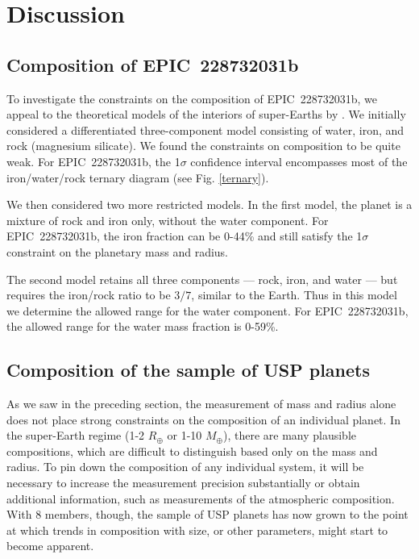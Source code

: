 \documentclass[twocolumn]{aastex61}
\begin{document}
\section{Discussion}

\subsection{Composition of EPIC~228732031b}

To investigate the constraints on the composition of  EPIC~228732031b,
we appeal to the theoretical models of the interiors of super-Earths by \citet{Zeng2016}.
We initially considered a differentiated three-component model
consisting of water, iron, and rock (magnesium silicate). We found the constraints on composition
to be quite weak. For EPIC~228732031b, the 1$\sigma$ confidence interval encompasses most of the iron/water/rock ternary diagram (see Fig. \ref{ternary}).

We then considered two more restricted models. In the first model, the planet is a mixture of rock and iron only, without the water component. For EPIC~228732031b, the iron fraction can be 0-44\% and still satisfy the 1$\sigma$ constraint on the planetary mass and radius.


The second model retains all three components --- rock, iron, and water --- but requires the iron/rock ratio to be $3/7$, similar
to the Earth. Thus in this model we determine the allowed range for the water component.
For EPIC~228732031b, the allowed range for the water mass fraction is 0-59\%.%


\subsection{Composition of the sample of USP planets}

As we saw in the preceding section, the measurement of mass and radius alone does not place
strong constraints on the composition of an individual planet. In the super-Earth regime (1-2 $R_{\oplus}$ or 1-10 $M_{\oplus}$),
there are many plausible compositions, which are difficult to distinguish based only on the mass and radius. To pin down the composition of any individual system, it will be necessary
to increase the measurement precision substantially or obtain additional information, such as
measurements of the atmospheric composition. With 8 members, though, the sample of USP planets has now grown to the point at which trends in composition with size, or other parameters, might start to become apparent.
\end{document}
